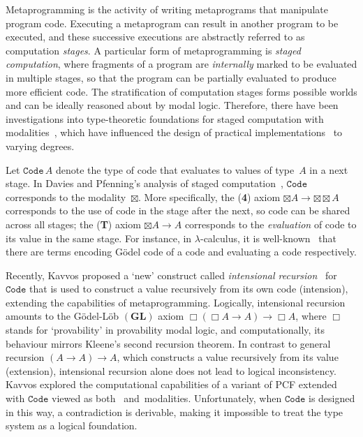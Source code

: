 \documentclass[a4paper,UKenglish,numberwithinsect,cleveref,thm-restate,draft]{lipics-v2021}
\numberwithin{equation}{section}
\theoremstyle{definition}
\theoremstyle{plain}
\begin{document}
Metaprogramming is the activity of writing metaprograms that manipulate program code.
Executing a metaprogram can result in another program to be executed, and these successive executions are abstractly referred to as computation \emph{stages}.
A particular form of metaprogramming is \emph{staged computation}, where fragments of a program are \emph{internally} marked to be evaluated in multiple stages, so that the program can be partially evaluated to produce more efficient code.
The stratification of computation stages forms possible worlds and can be ideally reasoned about by modal logic.
Therefore, there have been investigations into type-theoretic foundations for staged computation with modalities~\cite{Davies2017,Davies2001b,Kavvos2017a,Nanevski2008}, which have influenced the design of practical implementations~\cite{Kiselyov2014,Sheard2002,Taha2000} to varying degrees.

Let $\mathtt{Code}\,A$ denote the type of code that evaluates to values of type~$A$ in a next stage.
In Davies and Pfenning's analysis of staged computation~\cite{Davies2001b}, $\mathtt{Code}$ corresponds to the \SFour modality~$\boxtimes$.
More specifically, the (\textbf{4}) axiom $\boxtimes A \to {\boxtimes} {\boxtimes} A$ corresponds to the use of code in the stage after the next, so code can be shared across all stages;
the (\textbf{T}) axiom $\boxtimes A \to A$ corresponds to the \emph{evaluation} of code to its value in the same stage.
For instance, in $\lambda$-calculus, it is well-known~\cite{Barendregt1984a} that there are terms encoding Gödel code of a code and evaluating a code respectively.

Recently, Kavvos proposed a `new' construct called \emph{intensional recursion}~\cite{Kavvos2017a} for $\mathtt{Code}$ that is used to construct a value recursively from its own code (intension), extending the capabilities of metaprogramming.
Logically, intensional recursion amounts to the Gödel-Löb $(\mathbf{GL})$ axiom $\Box (\Box A \to A) \to \Box A$, where $\Box$ stands for `provability' in provability modal logic, and computationally, its behaviour mirrors Kleene's second recursion theorem.
In contrast to general recursion $(A \to A) \to A$, which constructs a value recursively from its value (extension), intensional recursion alone does not lead to logical inconsistency.
Kavvos explored the computational capabilities of a variant of PCF extended with $\mathtt{Code}$ viewed as both \SFour~and~\GL modalities.
Unfortunately, when $\mathtt{Code}$ is designed in this way, a contradiction is derivable, making it impossible to treat the type system as a logical foundation.
\end{document}
